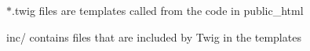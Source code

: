 {\ttfamily $\ast$.twig} files are templates called from the code in {\ttfamily public\+\_\+html}

{\ttfamily inc/} contains files that are included by Twig in the templates 